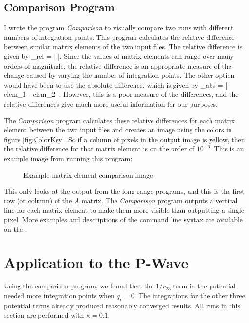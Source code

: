 \documentclass[Dissertation.tex]{subfiles}
\begin{document}
\subsection{Comparison Program}
I wrote the program \emph{Comparison} \cite{} to visually compare two runs with different numbers of integration points. This program calculates the relative difference between similar matrix elements of the two input files. The relative difference is given by
\beq
{}_{rel} = \left|  \right|.
\eeq
Since the values of matrix elements can range over many orders of magnitude, the relative difference is an appropriate measure of the change caused by varying the number of integration points. The other option would have been to use the absolute difference, which is given by 
\beq
{}_{abs} = \left| elem_1 - elem_2 \right|.
\eeq
However, this is a poor measure of the differences, and the relative differences give much more useful information for our purposes.

The \emph{Comparison} program calculates these relative differences for each matrix element between the two input files and creates an image using the colors in figure \ref{fig:ColorKey}. So if a column of pixels in the output image is yellow, then the relative difference for that matrix element is on the order of $10^{-6}$. This is an example image from running this program:
\begin{figure}[H]
	\centering
	\caption{Example matrix element comparison image}
	\label{fig:QuadExample}
\end{figure}
This only looks at the output from the long-range programs, and this is the first row (or column) of the $A$ matrix. The \emph{Comparison} program outputs a vertical line for each matrix element to make them more visible than outputting a single pixel. More examples and descriptions of the command line syntax are available on the  \cite{Wiki}.

\section{Application to the P-Wave}

Using the comparison program, we found that the $1/r_{23}$ term in the potential needed more integration points when $q_i = 0$. The integrations for the other three potential terms already produced reasonably converged results. All runs in this section are performed with $\kappa = 0.1$.
\end{document}
